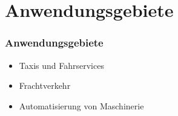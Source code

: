 \section{Anwendungsgebiete}

\begin{frame}
    \frametitle{Anwendungsgebiete}
    
    \begin{itemize}
        \item Taxis und Fahrservices
        \item Frachtverkehr
        \item Automatisierung von Maschinerie
    \end{itemize}
\end{frame}